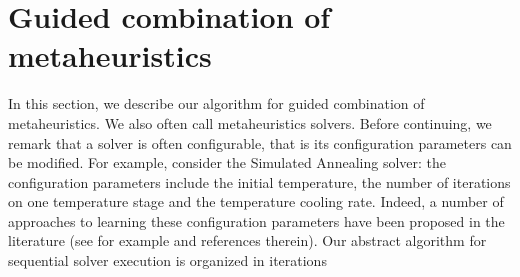 \section{Guided combination of metaheuristics} \label{sec:combination}
In this section, we describe our algorithm for guided combination of metaheuristics. We also often call metaheuristics solvers. Before continuing, we remark that a solver is often configurable, that is its configuration parameters can be modified. For example, consider the Simulated Annealing solver: the configuration parameters include the initial temperature, the number of iterations on one temperature stage and the temperature cooling rate. Indeed, a number of approaches to learning these configuration parameters have been proposed in the literature (see for example \cite{HutHooLey11-smac} and references therein). %
Our abstract algorithm for sequential solver execution is organized in iterations



